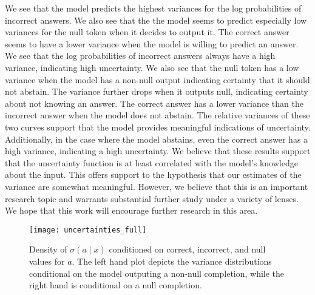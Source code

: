 \documentclass{article} \usepackage{iclr2023_conference,times}
\begin{document}
We see that the model predicts the highest variances for the log probabilities of incorrect answers.
We also see that the the model seems to predict especially low variances for the null token when it decides to output it.
The correct answer seems to have a lower variance when the model is willing to predict an answer. 
We see that the log probabilities of incorrect answers always have a high variance, indicating high uncertainty. We also see that the null token has a low variance when the model has a non-null output indicating certainty that it should not abstain. The variance further drops when it outputs null, indicating certainty about not knowing an answer. The correct answer has a lower variance than the incorrect answer when the model does not abstain. The relative variances of these two curves support that the model provides meaningful indications of uncertainty. Additionally, in the case where the model abstains, even the correct answer has a high variance, indicating a high uncertainty.
We believe that these results support that the uncertainty function is at least correlated with the model's knowledge about the input.
This offers support to the hypothesis that our estimates of the variance are somewhat meaningful.
However, we believe that this is an important research topic and warrants substantial further study under a variety of lenses.
We hope that this work will encourage further research in this area.
\begin{figure}
    \centering
\texttt{[image: uncertainties\_full]}
\caption{Density of $\sigma(a\mid x)$ conditioned on correct, incorrect, and null values for $a$. The left hand plot depicts the variance distributions conditional on the model outputing a non-null completion, while the right hand is conditional on a null completion.}
    \label{fig:llm-uncertainty}
\end{figure}
 
\end{document}
